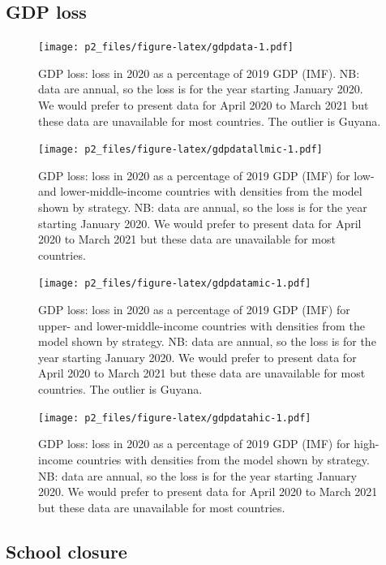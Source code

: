 \documentclass[
]{article}
\begin{document}
\hypertarget{gdp-loss}{%
\subsection{GDP loss}\label{gdp-loss}}

\begin{figure}
\centering
\texttt{[image: p2\_files/figure-latex/gdpdata-1.pdf]}
\caption{\label{fig:gdpdata}GDP loss: loss in 2020 as a percentage of 2019 GDP (IMF). NB: data are annual, so the loss is for the year starting January 2020. We would prefer to present data for April 2020 to March 2021 but these data are unavailable for most countries. The outlier is Guyana.}
\end{figure}

\begin{figure}
\centering
\texttt{[image: p2\_files/figure-latex/gdpdatallmic-1.pdf]}
\caption{\label{fig:gdpdatallmic}GDP loss: loss in 2020 as a percentage of 2019 GDP (IMF) for low- and lower-middle-income countries with densities from the model shown by strategy. NB: data are annual, so the loss is for the year starting January 2020. We would prefer to present data for April 2020 to March 2021 but these data are unavailable for most countries.}
\end{figure}

\begin{figure}
\centering
\texttt{[image: p2\_files/figure-latex/gdpdatamic-1.pdf]}
\caption{\label{fig:gdpdatamic}GDP loss: loss in 2020 as a percentage of 2019 GDP (IMF) for upper- and lower-middle-income countries with densities from the model shown by strategy. NB: data are annual, so the loss is for the year starting January 2020. We would prefer to present data for April 2020 to March 2021 but these data are unavailable for most countries. The outlier is Guyana.}
\end{figure}

\begin{figure}
\centering
\texttt{[image: p2\_files/figure-latex/gdpdatahic-1.pdf]}
\caption{\label{fig:gdpdatahic}GDP loss: loss in 2020 as a percentage of 2019 GDP (IMF) for high-income countries with densities from the model shown by strategy. NB: data are annual, so the loss is for the year starting January 2020. We would prefer to present data for April 2020 to March 2021 but these data are unavailable for most countries.}
\end{figure}

\newpage

\hypertarget{school-closure}{%
\subsection{School closure}\label{school-closure}}
\end{document}
